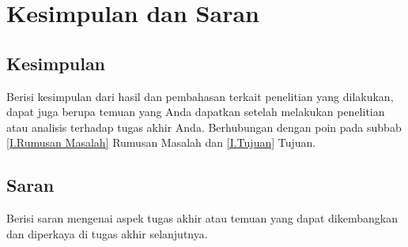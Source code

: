 \newpage
\chapter{Kesimpulan dan Saran} \label{Bab V}

\section{Kesimpulan} \label{V.Kesimpulan}
Berisi kesimpulan dari hasil dan pembahasan terkait penelitian yang dilakukan, dapat juga berupa temuan yang Anda dapatkan setelah melakukan penelitian atau analisis terhadap tugas akhir Anda. Berhubungan dengan poin pada subbab \ref{I.Rumusan Masalah} Rumusan Masalah dan \ref{I.Tujuan} Tujuan. 

\section{Saran} \label{V.Saran}
Berisi saran mengenai aspek tugas akhir atau temuan yang dapat dikembangkan dan diperkaya di tugas akhir selanjutnya. 